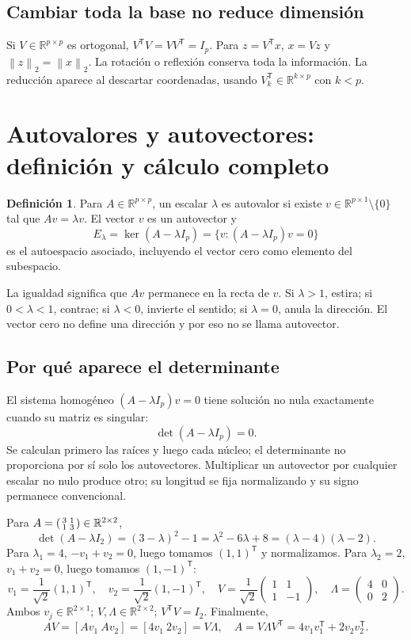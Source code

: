 \documentclass[11pt,a4paper]{article}
\newcommand{\R}{\mathbb R}
\newcommand{\T}{^{\mathsf T}}
\newcommand{\norm}[1]{\left\lVert #1\right\rVert}
\DeclareMathOperator{\kerop}{ker}
\theoremstyle{definition}
\newtheorem{definicion}[teorema]{Definición}
\begin{document}
\subsection{Cambiar toda la base no reduce dimensión}
Si $V\in\R^{p\times p}$ es ortogonal, $V\T V=VV\T=I_p$. Para $z=V\T x$, $x=Vz$ y $\norm z_2=\norm x_2$. La rotación o reflexión conserva toda la información. La reducción aparece al descartar coordenadas, usando $V_k\T\in\R^{k\times p}$ con $k<p$.

\section{Autovalores y autovectores: definición y cálculo completo}
\begin{definicion}
Para $A\in\R^{p\times p}$, un escalar $\lambda$ es autovalor si existe $v\in\R^{p\times1}\setminus\{0\}$ tal que $Av=\lambda v$. El vector $v$ es un autovector y
\[
E_\lambda=\kerop(A-\lambda I_p)=\{v:(A-\lambda I_p)v=0\}
\]
es el autoespacio asociado, incluyendo el vector cero como elemento del subespacio.
\end{definicion}
La igualdad significa que $Av$ permanece en la recta de $v$. Si $\lambda>1$, estira; si $0<\lambda<1$, contrae; si $\lambda<0$, invierte el sentido; si $\lambda=0$, anula la dirección. El vector cero no define una dirección y por eso no se llama autovector.
\subsection{Por qué aparece el determinante}
El sistema homogéneo $(A-\lambda I_p)v=0$ tiene solución no nula exactamente cuando su matriz es singular:
\[
\boxed{\det(A-\lambda I_p)=0.}
\]
Se calculan primero las raíces y luego cada núcleo; el determinante no proporciona por sí solo los autovectores. Multiplicar un autovector por cualquier escalar no nulo produce otro; su longitud se fija normalizando y su signo permanece convencional.
\begin{ejemplo}
Para $A=\begin{psmallmatrix}3&1\\1&3\end{psmallmatrix}\in\R^{2\times2}$,
\[
\det(A-\lambda I_2)=(3-\lambda)^2-1=\lambda^2-6\lambda+8
=(\lambda-4)(\lambda-2).
\]
Para $\lambda_1=4$, $-v_1+v_2=0$, luego tomamos $(1,1)\T$ y normalizamos. Para $\lambda_2=2$, $v_1+v_2=0$, luego tomamos $(1,-1)\T$:
\[
v_1=\frac1{\sqrt2}(1,1)\T,\quad v_2=\frac1{\sqrt2}(1,-1)\T,\quad
V=\frac1{\sqrt2}\begin{pmatrix}1&1\\1&-1\end{pmatrix},\quad
\Lambda=\begin{pmatrix}4&0\\0&2\end{pmatrix}.
\]
Ambos $v_j\in\R^{2\times1}$; $V,\Lambda\in\R^{2\times2}$; $V\T V=I_2$. Finalmente,
\[
AV=[Av_1\ Av_2]=[4v_1\ 2v_2]=V\Lambda,
\quad A=V\Lambda V\T=4v_1v_1\T+2v_2v_2\T.
\]
\end{ejemplo}
\end{document}
